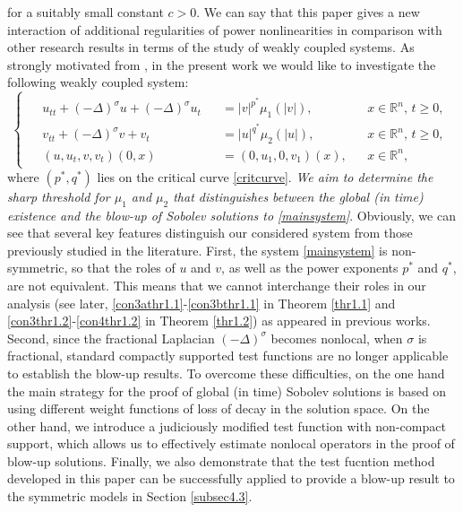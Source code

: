 \documentclass[11pt,reqno]{amsart}
\numberwithin{equation}{section}
\begin{document}
for a suitably small constant $c>0$. We can say that this paper gives a new interaction of additional regularities of power nonlinearities in comparison with other research results in terms of the study of weakly coupled systems. As strongly motivated from \cite{DuongDaoRei2025,AnhRei2021}, in the present work we would like to investigate the following weakly coupled system:
\begin{equation}\label{mainsystem}
\begin{cases}
\begin{aligned}
    &u_{tt}+(-\Delta)^{\sigma} u+(-\Delta)^{\sigma}u_t &&=|v|^{p^*}\mu_1(|v|), &&x\in \mathbb{R}^n,\,t\geq 0,\\
    &v_{tt}+(-\Delta)^{\sigma} v+v_t &&=|u|^{q^*}\mu_2(|u|), &&x\in \mathbb{R}^n,\,t\geq 0,\\
    &(u,u_t,v,v_t)(0,x) &&= (0,u_1,0,v_1)(x), &&x\in \mathbb{R}^n,
\end{aligned}
\end{cases}
\end{equation}
where $(p^*,q^*)$ lies on the critical curve \eqref{critcurve}. {\textit{We aim to determine the sharp threshold for $\mu_1$ and $\mu_2$ that distinguishes between the global (in time) existence and the blow-up of Sobolev solutions to \eqref{mainsystem}}}. Obviously, we can see that several key features distinguish our considered system from those previously studied in the literature. First, the system \eqref{mainsystem} is non-symmetric, so that the roles of $u$ and $v$, as well as the power exponents $p^*$ and $q^*$, are not equivalent. This means that we cannot interchange their roles in our analysis (see later, \eqref{con3athr1.1}-\eqref{con3bthr1.1} in Theorem \ref{thr1.1} and \eqref{con3thr1.2}-\eqref{con4thr1.2} in Theorem \ref{thr1.2}) as appeared in previous works. Second, since the fractional Laplacian $(-\Delta)^{\sigma}$ becomes nonlocal, when $\sigma$ is fractional, standard compactly supported test functions are no longer applicable to establish the blow-up results. To overcome these difficulties, on the one hand the main strategy for the proof of global (in time) Sobolev solutions is based on using different weight functions of loss of decay in the solution space. On the other hand, we introduce a judiciously modified test function with non-compact support, which allows us to effectively estimate nonlocal operators in the proof of blow-up solutions. Finally, we also demonstrate that the test fucntion method developed in this paper can be successfully applied to provide a blow-up result to the symmetric models in Section \ref{subsec4.3}. \medskip
\end{document}

